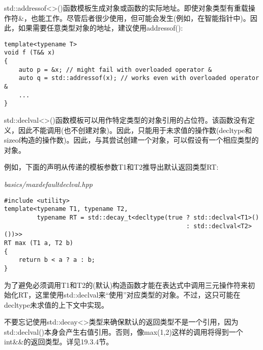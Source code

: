 
std::addressof<>()函数模板生成对象或函数的实际地址。即使对象类型有重载操作符\&，也能工作。尽管后者很少使用，但可能会发生(例如，在智能指针中)。因此，如果需要任意类型对象的地址，建议使用addressof():

\begin{lstlisting}[style=styleCXX]
template<typename T>
void f (T&& x)
{
	auto p = &x; // might fail with overloaded operator &
	auto q = std::addressof(x); // works even with overloaded operator &
	...
}
\end{lstlisting}


std::declval<>()函数模板可以用作特定类型的对象引用的占位符。该函数没有定义，因此不能调用(也不创建对象)。因此，只能用于未求值的操作数(decltype和sizeof构造的操作数)。因此，与其尝试创建一个对象，可以假设有一个相应类型的对象。

例如，下面的声明从传递的模板参数T1和T2推导出默认返回类型RT:

\noindent
\textit{basics/maxdefaultdeclval.hpp}
\begin{lstlisting}[style=styleCXX]
#include <utility>
template<typename T1, typename T2,
		 typename RT = std::decay_t<decltype(true ? std::declval<T1>()
												  : std::declval<T2>())>>
RT max (T1 a, T2 b)
{
	return b < a ? a : b;
}
\end{lstlisting}

为了避免必须调用T1和T2的(默认)构造函数才能在表达式中调用三元操作符来初始化RT，这里使用std::declval来“使用”对应类型的对象。不过，这只可能在decltype未求值的上下文中实现。

不要忘记使用std::decay<>类型来确保默认的返回类型不是一个引用，因为std::declval()本身会产生右值引用。否则，像max(1,2)这样的调用将得到一个int\&\&的返回类型。详见19.3.4节。






